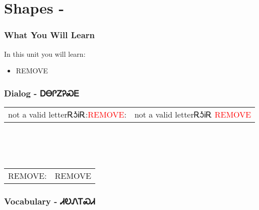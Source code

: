 \index{}
\chapter{Shapes - }
\subsection{What You Will Learn}
In this unit you will learn:
\begin{itemize}
\item REMOVE
\end{itemize}\newpage

\newpage\subsection{Dialog - ᎠᎾᎵᏃᎮᏍᎬ}
\begin{tabular}{p{2cm} p{11cm}}
not a valid letterᎡᎼᎥᎡ:\newline \textcolor{red}{REMOVE}: & not a valid letterᎡᎼᎥᎡ 
\newline\textcolor{red}{REMOVE}\\
\end{tabular}
\\
\\
\\
\noindent\begin{tabular}{p{2cm} p{11cm}}REMOVE: & REMOVE\\
\end{tabular}
\vfill\newpage\subsection{Vocabulary - ᏗᎧᏁᎢᏍᏗ 
}
